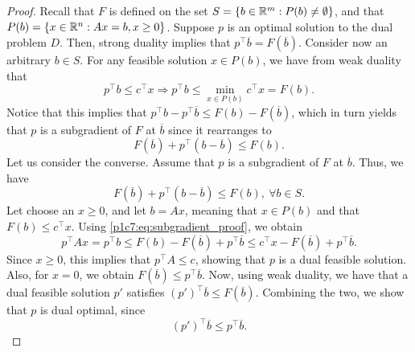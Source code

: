 \begin{proof}
	Recall that $F$ is defined on the set $S = \left\{ b \in \mathbb{R}^m : P(b) \neq \emptyset \right \}$, and that $P(b) = \left\{ x \in \mathbb{R}^n : Ax = b, x \geq 0 \right \}$. Suppose $p$ is an optimal solution to the dual problem $D$. Then, strong duality implies that $p^\top \overline{b} = F(\overline{b})$. Consider now an arbitrary $b \in S$. For any feasible solution $x \in P(b)$, we have from weak duality that 
	\begin{equation*}
		p^\top b \le c^\top x \Rightarrow p^\top b \le \min_{x \in P(b)} c^\top x = F(b).
	\end{equation*}
	Notice that this implies that $p^\top b - p^\top \overline{b} \le F(b) - F(\overline{b})$, which in turn yields that $p$ is a subgradient of $F$ at $\overline{b}$ since it rearranges to
	\begin{equation*}
		F(\overline{b}) + p^\top (b - \overline{b}) \le F(b).
	\end{equation*}
	Let us consider the converse. Assume that $p$ is a subgradient of $F$ at $\overline{b}$. Thus, we have 
	\begin{equation}
		F(\overline{b}) + p^\top (b - \overline{b}) \le F(b), \ \forall b \in S. \label{p1c7:eq:subgradient_proof}
	\end{equation}
	Let choose an $x \ge 0$, and let $b = Ax$, meaning that $x \in P(b)$ and that $F(b) \le c^\top x$. Using \eqref{p1c7:eq:subgradient_proof}, we obtain
	\begin{equation*}
		p^\top Ax = p^\top b \le F(b) - F(\overline{b}) + p^\top \overline{b} \le c^\top x - F(\overline{b}) + p^\top \overline{b}.
	\end{equation*}
	Since $x \ge 0$, this implies that $p^\top A \le c$, showing that $p$ is a dual feasible solution. Also, for $x = 0$, we obtain $F(\overline{b}) \le p^\top \overline{b}$. Now, using weak duality, we have that a dual feasible solution $p'$ satisfies $(p')^\top \overline{b} \le F(\overline{b})$. Combining the two, we show that $p$ is dual optimal, since
	\begin{equation*}
		(p')^\top \overline{b} \le  p^\top \overline{b}.
	\end{equation*}
\end{proof}

